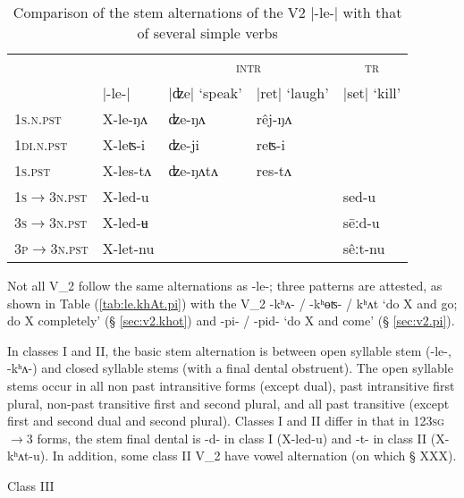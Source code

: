 \documentclass[oneside,a4paper,11pt]{article}
\newcommand{\ipa}[1]{{\phon#1}}
\newcommand{\dhatu}[2]{|\ipa{#1}| `#2'}
\newcommand{\grise}[1]{\cellcolor{lightgray}\textbf{#1}}
\begin{document}
\begin{table}[H] 
\caption{Comparison of the stem alternations of the V2 \ipa{|-le-|}  with that of several simple verbs} \label{tab:le.dze.ret} \centering 
\begin{tabular}{lllll} 
\toprule 
&& \multicolumn{2}{c}{\textsc{intr}} & \multicolumn{1}{c}{\textsc{tr}} \\ 
&\ipa{|-le-|}&\dhatu{ʣe}{speak} & \dhatu{ret}{laugh} & \dhatu{set}{kill}\\ 
\midrule
\textsc{1s.n.pst} &  \ipa{X-{le}-ŋʌ} & \ipa{ʣe-ŋʌ} & \ipa{rêj-ŋʌ} \grise{}&\grise{} \\ 
\textsc{1di.n.pst} &  \ipa{X-{leʦ}-i} & \ipa{ʣe-ji} \grise{}& \ipa{reʦ-i} &\grise{} \\ 
\textsc{1s.pst} & \ipa{X-{les}-tʌ} & \ipa{ʣe-ŋʌtʌ} \grise{}&  \ipa{res-tʌ} &\grise{} \\ 
\hline 
\textsc{1s$\rightarrow$3n.pst} &  \ipa{X-{led}-u} &\grise{} & \grise{} & \ipa{sed-u} \\ 
\textsc{3s$\rightarrow$3n.pst} &    \ipa{X-{led}-ʉ} &\grise{} & \grise{} & \ipa{sēːd-u} \\ 
\textsc{3p$\rightarrow$3n.pst} &    \ipa{X-{let}-nu} &\grise{} & \grise{} & \ipa{sêːt-nu} \\ 
\bottomrule 
\end{tabular}
\end{table}

Not all V_2 follow the same alternations as \ipa{-le-}; three patterns are attested, as shown in Table (\ref{tab:le.khAt.pi}) with the V_2 \ipa{-kʰʌ- / -kʰɵʦ- / kʰʌt} `do X and go; do X completely' (§ \ref{sec:v2.khot}) and \ipa{-pi- / -pid-} `do X and come'  (§ \ref{sec:v2.pi}).

In classes I and II, the basic stem alternation is between open syllable stem (\ipa{-le-}, \ipa{-kʰʌ-}) and closed syllable stems (with a final dental obstruent).  The open syllable stems occur in all non past intransitive forms (except dual), past intransitive first plural, non-past transitive first and second plural, and all past transitive (except first and second dual and second plural). Classes I and II differ in that in 123\textsc{sg}$\rightarrow$3 forms, the stem final dental is \ipa{-d-} in class I (\ipa{X-led-u}) and \ipa{-t-} in class II (\ipa{X-kʰʌt-u}). In addition, some class II  V_2 have vowel alternation (on which § XXX).

Class III 
\end{document}
